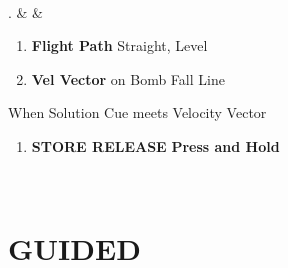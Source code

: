 \documentclass[fontInter]{TechCheck}
\begin{document}
\begin{listtabular}
\begin{minipage}[t]{\linewidth}
		\end{minipage} \\
		. &  &
		\begin{minipage}[t]{\linewidth}
			\vspace{-7pt}
			\begin{enumerate}
				\item \textbf{Flight Path} \dotfill Straight, Level
				\item \textbf{Vel Vector} \dotfill on Bomb Fall Line
			\end{enumerate}
			When Solution Cue meets Velocity Vector
			\begin{enumerate}[label=(\alph*), resume]
				\item \textbf{STORE RELEASE} \dotfill \textbf{Press and Hold}
			\end{enumerate}
		\end{minipage} \\
	\end{listtabular}

	\clearpage

	\section{GUIDED}
\end{document}
